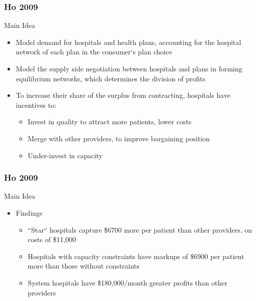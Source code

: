 \documentclass[xcolor=pdftex,dvipsnames,table,mathserif]{beamer}
\begin{document}

\begin{frame}
\frametitle{Ho 2009}

Main Idea
\begin{itemize}
	\item Model demand for hospitals and health plans, accounting for the hospital network of each plan in the consumer`s plan choice
	\item Model the supply side negotiation between hospitals and plans in forming equilibrium networks, which determines the division of profits
        \item To increase their share of the surplus from contracting, hospitals have incentives to:
         \begin{itemize}
	\item Invest in quality to attract more patients, lower costs
	\item Merge with other providers, to improve bargaining position
	\item Under-invest in capacity
	\end{itemize}
\end{itemize}
\end{frame}


\begin{frame}
\frametitle{Ho 2009}

Main Idea
\begin{itemize}
\item Findings
\begin{itemize}
\item ``Star`` hospitals capture \$6700 more per patient than other providers, on costs of \$11,000
\item Hospitals with capacity constraints have markups of \$6900 per patient more than those without constraints
\item System hospitals have \$180,000/month greater profits than other providers
\end{itemize}
\end{itemize}
\end{frame}

\end{document}
